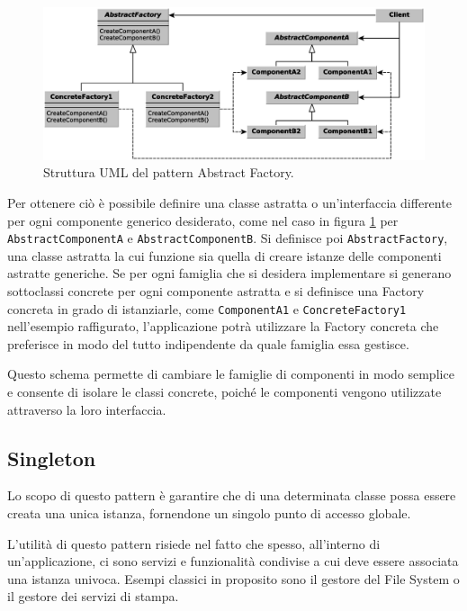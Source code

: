 \begin{figure}
\begin{center}
\includegraphics[width=13cm]{Immagini/AbstractFactoryPattern}
\caption{Struttura UML del pattern Abstract Factory.\label{f:abstractfactorypattern}} 
\end{center} 
\end{figure}

Per ottenere ci\`o \`e possibile definire una classe astratta o un'interfaccia differente per ogni componente generico desiderato, come nel caso in figura \ref{f:abstractfactorypattern} per \texttt{AbstractComponentA} e \texttt{AbstractComponentB}.
Si definisce poi \texttt{AbstractFactory}, una classe astratta la cui funzione sia quella di creare istanze delle componenti astratte generiche. Se per ogni famiglia che si desidera implementare si generano sottoclassi concrete per ogni componente astratta e si definisce una Factory concreta in grado di istanziarle, come \texttt{ComponentA1} e \texttt{ConcreteFactory1} nell'esempio raffigurato, l'applicazione potr\`a utilizzare la Factory concreta che preferisce in modo del tutto indipendente da quale famiglia essa gestisce.

Questo schema permette di cambiare le famiglie di componenti in modo semplice e consente di isolare le classi concrete, poich\'e le componenti vengono utilizzate attraverso la loro interfaccia.

\subsection{Singleton}
\label{sub:singleton}
Lo scopo di questo pattern \`e garantire che di una determinata classe possa essere creata una unica istanza, fornendone un singolo punto di accesso globale.

L'utilit\`a di questo pattern risiede nel fatto che spesso, all'interno di un'applicazione, ci sono servizi e funzionalit\`a condivise a cui deve essere associata una istanza univoca. Esempi classici in proposito sono il gestore del File System o il gestore dei servizi di stampa.

